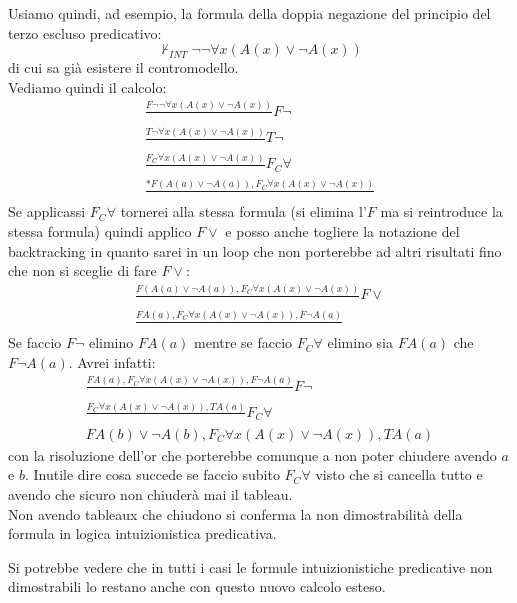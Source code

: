 \documentclass[a4paper,12pt, oneside]{book}
\begin{document}
\begin{esempio}
  Usiamo quindi, ad esempio, la formula della doppia negazione del principio del
  terzo escluso predicativo:
  \[\nvdash_{INT} \neg\neg \forall x(A(x)\lor \neg A(x))\]
  di cui sa già esistere il contromodello.\\
  Vediamo quindi il calcolo:
  \begin{gather*}
    \frac{F \neg\neg \forall x(A(x)\lor \neg A(x))}{}F\neg\\
    \frac{T\neg \forall x (A(x)\lor \neg A(x))}{}T\neg\\
    \frac{F_C\forall x (A(x)\lor \neg A(x))}{}F_C\forall\\
    \frac{*F(A(a)\lor\neg A(a)),F_C\forall x (A(x)\lor \neg A(x))}{}
  \end{gather*}
  Se applicassi $F_C\forall$ tornerei alla stessa formula (si elimina l'$F$ ma
  si reintroduce la stessa formula) quindi applico $F\lor$ e posso anche
  togliere la notazione del backtracking in quanto sarei in un loop che non
  porterebbe ad altri risultati fino che non si sceglie di fare $F\lor$:
  \begin{gather*}
    \frac{F(A(a)\lor\neg A(a)),F_C\forall x (A(x)\lor \neg A(x))}{}F\lor\\
    \frac{FA(a), F_C\forall x(A(x)\lor\neg A(x)),F\neg A(a)}{} 
  \end{gather*}
  Se faccio $F\neg$ elimino $FA(a)$ mentre se faccio $F_C\forall$ elimino sia
  $FA(a)$ che $F\neg A(a)$. Avrei infatti:
  \begin{gather*}
    \frac{FA(a), F_C\forall x(A(x)\lor\neg A(x)),F\neg A(a)}{} F\neg\\
    \frac{F_C\forall x(A(x)\lor\neg A(x)), TA(a)}{}F_C\forall\\
    FA(b)\lor\neg A(b),F_C\forall x(A(x)\lor\neg A(x)),TA(a)
  \end{gather*}
  con la risoluzione dell'or che porterebbe comunque a non poter chiudere avendo
  $a$ e $b$. Inutile dire cosa succede se faccio subito $F_C\forall$ visto che
  si cancella tutto e avendo che sicuro non chiuderà mai il tableau.\\
  Non avendo tableaux che chiudono si conferma la non dimostrabilità della
  formula in logica intuizionistica predicativa.
\end{esempio}
Si potrebbe vedere che in tutti i casi le formule intuizionistiche predicative
non dimostrabili lo restano anche con questo nuovo calcolo esteso.
\end{document}
